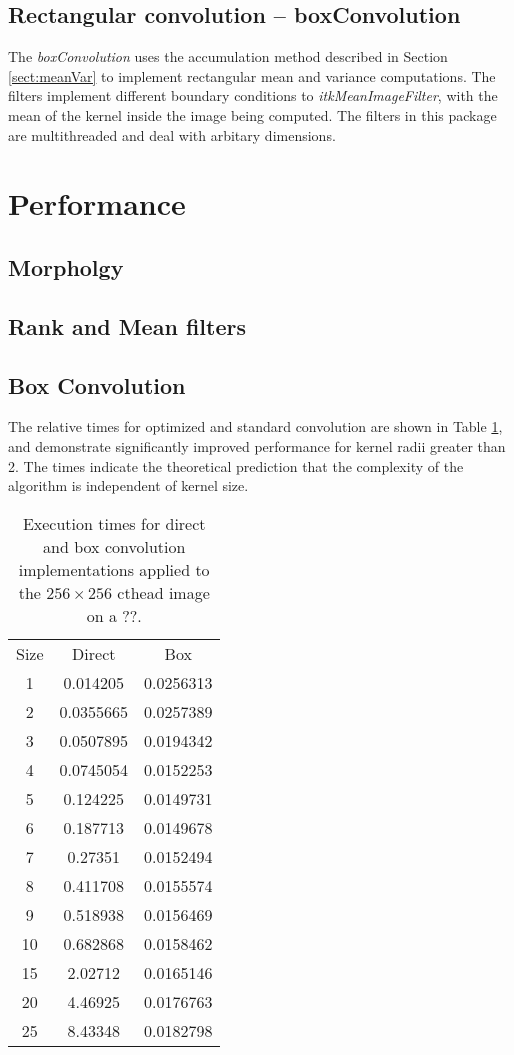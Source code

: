 \documentclass{InsightArticle}
\begin{document}
\subsection{Rectangular convolution -- boxConvolution}
The {\em boxConvolution} uses the accumulation method described in
Section \ref{sect:meanVar} to implement rectangular mean and variance
computations. The filters implement different boundary conditions to
{\em itkMeanImageFilter}, with the mean of the kernel inside the image
being computed. The filters in this package are multithreaded and deal
with arbitary dimensions.

\section{Performance}
\subsection{Morpholgy}


\subsection{Rank and Mean filters}

\subsection{Box Convolution}
The relative times for optimized and standard convolution are shown in
Table \ref{tab:perfBoxConv}, and demonstrate significantly improved
performance for kernel radii greater than 2. The times indicate the
theoretical prediction that the complexity of the algorithm is
independent of kernel size.
\begin{table}[htbp]
\centering
\begin{tabular}{ccc}
\hline
Size  &  Direct &  Box \\
1  &     0.014205    &    0.0256313 \\
2  &     0.0355665   &    0.0257389 \\
3  &     0.0507895   &    0.0194342 \\
4  &     0.0745054   &    0.0152253 \\
5  &     0.124225    &    0.0149731 \\
6  &     0.187713    &    0.0149678 \\
7  &     0.27351     &    0.0152494 \\
8  &     0.411708    &    0.0155574 \\
9  &     0.518938    &    0.0156469 \\
10 &     0.682868    &    0.0158462 \\
15  &    2.02712     &    0.0165146 \\
20  &    4.46925     &    0.0176763 \\
25  &    8.43348      & 0.0182798 \\
\hline
\hline
\end{tabular}
\caption{Execution times for direct and box convolution implementations applied to the $256 \times 256$ cthead image on a ??.\label{tab:perfBoxConv}}
\end{table}
\end{document}
